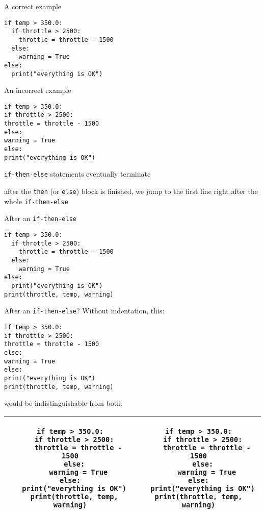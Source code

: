 \documentclass{beamer}
\begin{document}
\begin{frame}[fragile]{A correct example}
\begin{lstlisting}[frame=shadowbox]
if temp > 350.0:
  if throttle > 2500:
    throttle = throttle - 1500
  else:
    warning = True
else:
  print("everything is OK")
\end{lstlisting}
\end{frame}

\begin{frame}[fragile]{An incorrect example}
\begin{lstlisting}[frame=shadowbox]
if temp > 350.0:
if throttle > 2500:
throttle = throttle - 1500
else:
warning = True
else:
print("everything is OK")
\end{lstlisting}
\end{frame}

\begin{slide}{
\item \texttt{if-then-else} statements eventually terminate
\item after the \texttt{then} (or \texttt{else}) block is finished, we jump to the first line right after the whole \texttt{if-then-else}
}\end{slide}

\begin{frame}[fragile]{After an \texttt{if-then-else}}
\begin{lstlisting}[frame=shadowbox]
if temp > 350.0:
  if throttle > 2500:
    throttle = throttle - 1500
  else:
    warning = True
else:
  print("everything is OK")
print(throttle, temp, warning)
\end{lstlisting}
\end{frame}

\begin{frame}[fragile]{After an \texttt{if-then-else}?}
Without indentation, this:
\begin{lstlisting}[frame=shadowbox,basicstyle=\ttfamily\tiny]
if temp > 350.0:
if throttle > 2500:
throttle = throttle - 1500
else:
warning = True
else:
print("everything is OK")
print(throttle, temp, warning)
\end{lstlisting}

would be indistinguishable from both:

\begin{tabular}{| c | c |}
\hline
\begin{lstlisting}[basicstyle=\ttfamily\tiny]
if temp > 350.0:
  if throttle > 2500:
    throttle = throttle - 1500
  else:
    warning = True
else:
  print("everything is OK")
  print(throttle, temp, warning)
\end{lstlisting}
&
\begin{lstlisting}[basicstyle=\ttfamily\tiny]
if temp > 350.0:
  if throttle > 2500:
    throttle = throttle - 1500
  else:
    warning = True
else:
  print("everything is OK")
print(throttle, temp, warning)
\end{lstlisting} \\
\hline
\end{tabular}
\end{frame}
\end{document}
